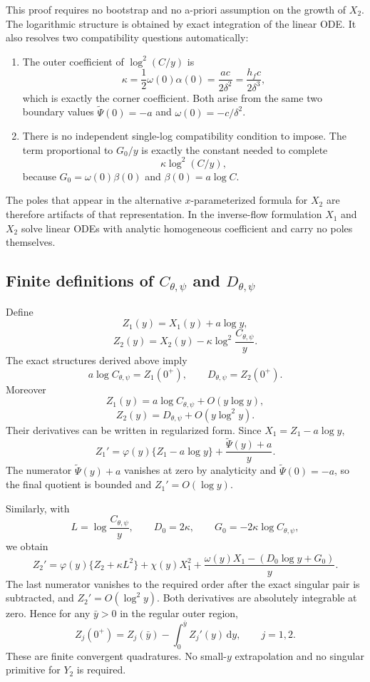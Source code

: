 \documentclass[11pt]{article}
\newcommand{\dd}{\,\mathrm{d}}
\begin{document}
This proof requires no bootstrap and no a-priori assumption on the growth of \(X_2\).  The logarithmic structure is obtained by exact integration of the linear ODE.  It also resolves two compatibility questions automatically:

\begin{enumerate}
\item The outer coefficient of \(\log^2(C/y)\) is
\[
\kappa=\frac12\omega(0)\alpha(0)
=\frac{ac}{2\delta^2}
=\frac{h_fc}{2\delta^3},
\]
which is exactly the corner coefficient.  Both arise from the same two boundary values \(\widetilde\Psi(0)=-a\) and \(\omega(0)=-c/\delta^2\).
\item There is no independent single-log compatibility condition to impose.  The term proportional to \(G_0/y\) is exactly the constant needed to complete
\[
\kappa\log^2(C/y),
\]
because \(G_0=\omega(0)\beta(0)\) and \(\beta(0)=a\log C\).
\end{enumerate}

The poles that appear in the alternative \(x\)-parameterized formula for \(X_2\) are therefore artifacts of that representation.  In the inverse-flow formulation \(X_1\) and \(X_2\) solve linear ODEs with analytic homogeneous coefficient and carry no poles themselves.

\subsection{Finite definitions of \texorpdfstring{\(C_{\theta,\psi}\)}{C} and \texorpdfstring{\(D_{\theta,\psi}\)}{D}}
Define
\[
Z_1(y)=X_1(y)+a\log y,
\]
\[
Z_2(y)=X_2(y)-\kappa\log^2\frac{C_{\theta,\psi}}{y}.
\]
The exact structures derived above imply
\[
\boxed{a\log C_{\theta,\psi}=Z_1(0^+)},
\qquad
\boxed{D_{\theta,\psi}=Z_2(0^+)}.
\]
Moreover
\[
Z_1(y)=a\log C_{\theta,\psi}+O(y\log y),
\]
\[
Z_2(y)=D_{\theta,\psi}+O(y\log^2y).
\]
Their derivatives can be written in regularized form.  Since \(X_1=Z_1-a\log y\),
\[
\boxed{
Z_1'
=\varphi(y)\{Z_1-a\log y\}
+\frac{\widetilde\Psi(y)+a}{y}}.
\]
The numerator \(\widetilde\Psi(y)+a\) vanishes at zero by analyticity and \(\widetilde\Psi(0)=-a\), so the final quotient is bounded and \(Z_1'=O(\log y)\).

Similarly, with
\[
L=\log\frac{C_{\theta,\psi}}y,
\qquad
D_0=2\kappa,
\qquad
G_0=-2\kappa\log C_{\theta,\psi},
\]
we obtain
\[
\boxed{
Z_2'
=\varphi(y)\{Z_2+\kappa L^2\}
+\chi(y)X_1^2
+\frac{\omega(y)X_1-(D_0\log y+G_0)}{y}}.
\]
The last numerator vanishes to the required order after the exact singular pair is subtracted, and \(Z_2'=O(\log^2y)\).  Both derivatives are absolutely integrable at zero.  Hence for any \(\bar y>0\) in the regular outer region,
\[
\boxed{
Z_j(0^+)=Z_j(\bar y)-\int_0^{\bar y}Z_j'(y)\dd y,
\qquad j=1,2}.
\]
These are finite convergent quadratures.  No small-\(y\) extrapolation and no singular primitive for \(Y_2\) is required.
\end{document}
